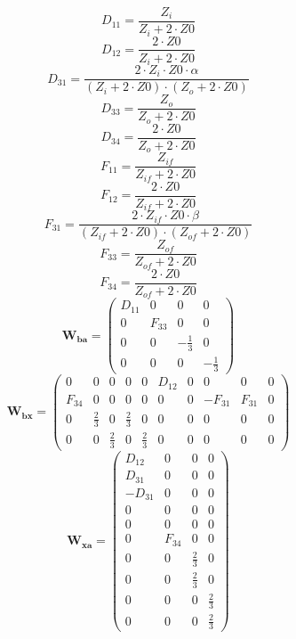 \[ D_{11}={\scriptstyle \frac{Z_i}{Z_i+2\cdot Z0}} \]
\[ D_{12}={\scriptstyle \frac{2\cdot Z0}{Z_i+2\cdot Z0}} \]
\[ D_{31}={\scriptstyle \frac{2\cdot Z_i\cdot Z0\cdot
\alpha}{\left(Z_i+2\cdot Z0\right)\cdot\left(Z_o+2\cdot Z0\right)}} \]
\[ D_{33}={\scriptstyle \frac{Z_o}{Z_o+2\cdot Z0}} \]
\[ D_{34}={\scriptstyle \frac{2\cdot Z0}{Z_o+2\cdot Z0}} \]
\[ F_{11}={\scriptstyle \frac{Z_{if}}{Z_{if}+2\cdot Z0}} \]
\[ F_{12}={\scriptstyle \frac{2\cdot Z0}{Z_{if}+2\cdot Z0}} \]
\[ F_{31}={\scriptstyle \frac{2\cdot Z_{if}\cdot Z0\cdot
\beta}{\left(Z_{if}+2\cdot Z0\right)\cdot\left(Z_{of}+2\cdot
Z0\right)}} \]
\[ F_{33}={\scriptstyle \frac{Z_{of}}{Z_{of}+2\cdot Z0}} \]
\[ F_{34}={\scriptstyle \frac{2\cdot Z0}{Z_{of}+2\cdot Z0}} \]
\[ \mathbf{W_{ba}} = \left(\begin{smallmatrix} D_{11} & 0 & 0 & 0 \\ 0
& F_{33} & 0 & 0 \\ 0 & 0 & -\frac{1}{3} & 0 \\ 0 & 0 & 0 &
-\frac{1}{3} \end{smallmatrix}\right) \]
\[ \mathbf{W_{bx}} = \left(\begin{smallmatrix} 0 & 0 & 0 & 0 & 0 &
D_{12} & 0 & 0 & 0 & 0 \\ F_{34} & 0 & 0 & 0 & 0 & 0 & 0 & -F_{31} &
F_{31} & 0 \\ 0 & \frac{2}{3} & 0 & \frac{2}{3} & 0 & 0 & 0 & 0 & 0 &
0 \\ 0 & 0 & \frac{2}{3} & 0 & \frac{2}{3} & 0 & 0 & 0 & 0 & 0
\end{smallmatrix}\right) \]
\[ \mathbf{W_{xa}} = \left(\begin{smallmatrix} D_{12} & 0 & 0 & 0 \\
D_{31} & 0 & 0 & 0 \\ -D_{31} & 0 & 0 & 0 \\ 0 & 0 & 0 & 0 \\ 0 & 0 &
0 & 0 \\ 0 & F_{34} & 0 & 0 \\ 0 & 0 & \frac{2}{3} & 0 \\ 0 & 0 &
\frac{2}{3} & 0 \\ 0 & 0 & 0 & \frac{2}{3} \\ 0 & 0 & 0 & \frac{2}{3}
\end{smallmatrix}\right) \]
